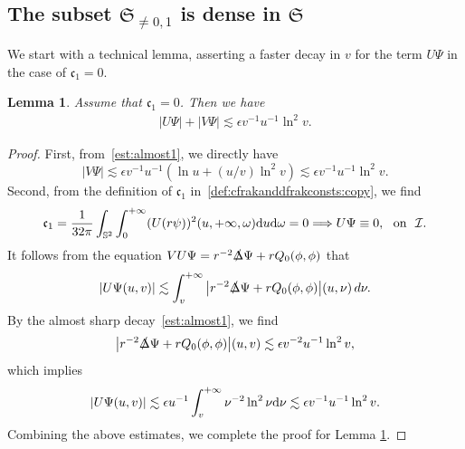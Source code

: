 \documentclass[a4paper,reqno]{amsart}
\newtheorem{lemma}[theorem]{Lemma}
\theoremstyle{definition}
\numberwithin{equation}{section}
\def \d {{\rm{d}}}
\def\Sfrak{\mathfrak{S}}
\begin{document}

\subsection{The subset $\Sfrak_{\neq 0, 1}$ is dense in $\Sfrak$}
\label{subsect:density:genericity}
We start with a technical lemma, asserting a faster decay in $v$ for the term $U\Psi$ in the case of $\mathfrak{c}_1=0$.

\begin{lemma}\label{lem:UPsi-v-decay}
    Assume that $\mathfrak{c}_1=0$. Then we have
    \begin{align*}
        |U\Psi|+|V\Psi|
        \lesssim
        \epsilon v^{-1}u^{-1}\ln^{2}v.
    \end{align*}
\end{lemma}
\begin{proof}
First, from~\eqref{est:almost1}, we directly have 
\begin{equation*}
    |V\Psi|
        \lesssim
        \epsilon v^{-1}u^{-1}\left(\ln u+(u/v)\ln^{2}v\right)
        \lesssim
        \epsilon v^{-1} u^{-1}\ln^{2}v.
\end{equation*}
Second, from the definition of $\mathfrak{c}_{1}$ in~\eqref{def:cfrakanddfrakconsts:copy}, we find 
\begin{equation*}
    \mathfrak{c}_{1}=\frac{1}{32\pi }\int_{\mathbb{S}^2}\int_{0}^{+\infty}(U (r\psi))^2 (u,+\infty,\omega)\d u \d\omega=0\Longrightarrow U\Psi\equiv 0,\ \ \mbox{on}\ \ \mathcal{I}.
\end{equation*}
It follows from the equation  $VU\Psi = r^{-2} \slashed{\Delta} \Psi + r Q_0(\phi, \phi)$ that 
\begin{equation*}
    |U\Psi(u, v)|
    \lesssim
    \int_v^{+\infty} \big|  r^{-2} \slashed{\Delta} \Psi + r Q_0(\phi, \phi)  \big|(u, \nu) \, d\nu.
\end{equation*}
By the almost sharp decay~\eqref{est:almost1}, we find 
\begin{equation*}
    \big|  r^{-2} \slashed{\Delta} \Psi + r Q_0(\phi, \phi)  \big|(u, v)
    \lesssim
    \epsilon v^{-2}u^{-1}\ln^{2}v,
\end{equation*}
which implies
\begin{equation*}
    |U\Psi(u, v)|
    \lesssim
    \epsilon u^{-1} \int_v^{+\infty}  \nu^{-2}\ln^{2}\nu \d \nu
    \lesssim
    \epsilon v^{-1} u^{-1}\ln^{2}v.
\end{equation*}
Combining the above estimates, we complete the proof for Lemma \ref{lem:UPsi-v-decay}.
\end{proof}
\end{document}
